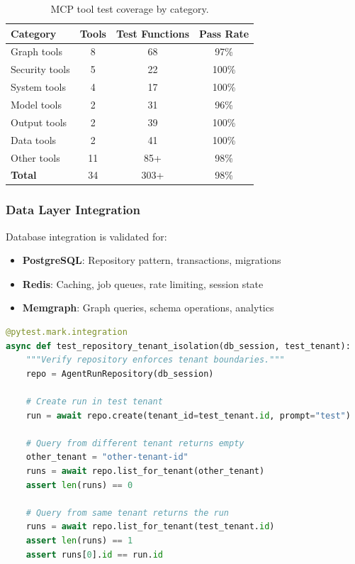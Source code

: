 \begin{table}[ht]
\centering
\caption{MCP tool test coverage by category.}
\label{tab:mcp-tool-coverage}
\small
\begin{tabular}{lccc}
\hline
\textbf{Category} & \textbf{Tools} & \textbf{Test Functions} & \textbf{Pass Rate} \\
\hline
Graph tools & 8 & 68 & 97\% \\
Security tools & 5 & 22 & 100\% \\
System tools & 4 & 17 & 100\% \\
Model tools & 2 & 31 & 96\% \\
Output tools & 2 & 39 & 100\% \\
Data tools & 2 & 41 & 100\% \\
Other tools & 11 & 85+ & 98\% \\
\hline
\textbf{Total} & 34 & 303+ & 98\% \\
\hline
\end{tabular}
\end{table}

\subsubsection{Data Layer Integration}

Database integration is validated for:

\begin{itemize}
    \item \textbf{PostgreSQL}: Repository pattern, transactions, migrations
    \item \textbf{Redis}: Caching, job queues, rate limiting, session state
    \item \textbf{Memgraph}: Graph queries, schema operations, analytics
\end{itemize}

\begin{lstlisting}[language=Python,caption={Database integration test pattern.}]
@pytest.mark.integration
async def test_repository_tenant_isolation(db_session, test_tenant):
    """Verify repository enforces tenant boundaries."""
    repo = AgentRunRepository(db_session)
    
    # Create run in test tenant
    run = await repo.create(tenant_id=test_tenant.id, prompt="test")
    
    # Query from different tenant returns empty
    other_tenant = "other-tenant-id"
    runs = await repo.list_for_tenant(other_tenant)
    assert len(runs) == 0
    
    # Query from same tenant returns the run
    runs = await repo.list_for_tenant(test_tenant.id)
    assert len(runs) == 1
    assert runs[0].id == run.id
\end{lstlisting}

